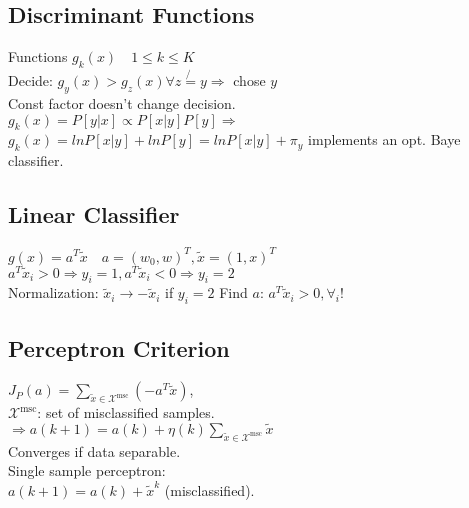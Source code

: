  \subsection*{Discriminant Functions}
 Functions $g_k(x)\quad1\leq k\leq K$\\
 Decide: $g_y(x){>}g_z(x)\forall z \not{=} y {\Rightarrow}$ chose $y$\\
 Const factor doesn't change decision.\\
 $g_k(x)=P[y|x]\propto P[x|y]P[y] \Rightarrow$\\
 $g_k(x){=}lnP[x|y]+lnP[y]{=}lnP[x|y]+\pi_y$
 implements an opt. Baye classifier.


\subsection*{Linear Classifier}
$g(x)=a^T\tilde{x}\quad a=(w_0,w)^T, \tilde{x}=(1,x)^T$\\
$a^T\tilde{x}_i>0 \Rightarrow y_i=1, a^T\tilde{x}_i<0 \Rightarrow y_i=2$\\
Normalization: $\tilde{x}_i\rightarrow-\tilde{x}_i$ if $y_i=2$
Find $a$: $a^T\tilde{x}_i>0,\forall_i$!
\subsection*{Perceptron Criterion}
$J_P(a)=\sum_{\tilde{x}\in\mathcal{X}^\text{msc}}(-a^T\tilde{x})$,\\
$\mathcal{X}^\text{msc}$: set of misclassified samples.\\
$\Rightarrow a(k+1)=a(k)+\eta(k) \sum_{\tilde{x}\in\mathcal{X}^\text{msc}} \tilde{x}$\\
Converges if data separable.\\
Single sample perceptron:\\
$a(k+1)=a(k)+\tilde{x}^k$ (misclassified).

